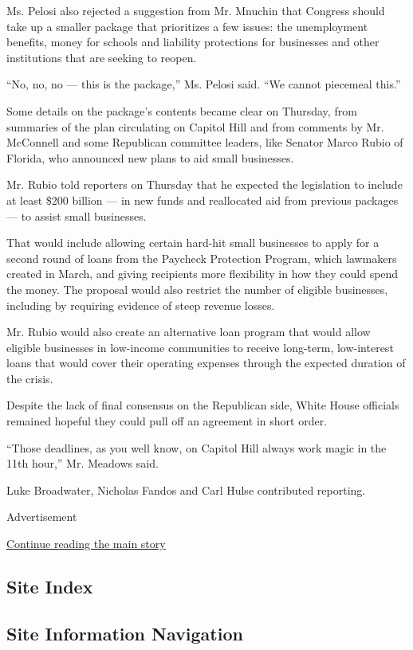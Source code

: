 Ms. Pelosi also rejected a suggestion from Mr. Mnuchin that Congress
should take up a smaller package that prioritizes a few issues: the
unemployment benefits, money for schools and liability protections for
businesses and other institutions that are seeking to reopen.

``No, no, no --- this is the package,'' Ms. Pelosi said. ``We cannot
piecemeal this.''

Some details on the package's contents became clear on Thursday, from
summaries of the plan circulating on Capitol Hill and from comments by
Mr. McConnell and some Republican committee leaders, like Senator Marco
Rubio of Florida, who announced new plans to aid small businesses.

Mr. Rubio told reporters on Thursday that he expected the legislation to
include at least \$200 billion --- in new funds and reallocated aid from
previous packages --- to assist small businesses.

That would include allowing certain hard-hit small businesses to apply
for a second round of loans from the Paycheck Protection Program, which
lawmakers created in March, and giving recipients more flexibility in
how they could spend the money. The proposal would also restrict the
number of eligible businesses, including by requiring evidence of steep
revenue losses.

Mr. Rubio would also create an alternative loan program that would allow
eligible businesses in low-income communities to receive long-term,
low-interest loans that would cover their operating expenses through the
expected duration of the crisis.

Despite the lack of final consensus on the Republican side, White House
officials remained hopeful they could pull off an agreement in short
order.

``Those deadlines, as you well know, on Capitol Hill always work magic
in the 11th hour,'' Mr. Meadows said.

Luke Broadwater, Nicholas Fandos and Carl Hulse contributed reporting.

Advertisement

\protect\hyperlink{after-bottom}{Continue reading the main story}

\hypertarget{site-index}{%
\subsection{Site Index}\label{site-index}}

\hypertarget{site-information-navigation}{%
\subsection{Site Information
Navigation}\label{site-information-navigation}}

